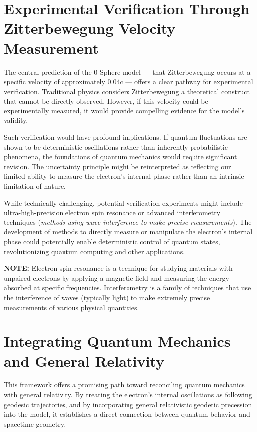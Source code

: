 \documentclass[12pt,letterpaper]{article} %
\begin{document}
\section{Experimental Verification Through Zitterbewegung Velocity Measurement}

The central prediction of the 0-Sphere model --- that Zitterbewegung occurs at a specific velocity of approximately 0.04c --- offers a clear pathway for experimental verification\cite{hanamura2025}. Traditional physics considers Zitterbewegung a theoretical construct that cannot be directly observed. However, if this velocity could be experimentally measured, it would provide compelling evidence for the model's validity.

Such verification would have profound implications. If quantum fluctuations are shown to be deterministic oscillations rather than inherently probabilistic phenomena, the foundations of quantum mechanics would require significant revision. The uncertainty principle might be reinterpreted as reflecting our limited ability to measure the electron's internal phase rather than an intrinsic limitation of nature.

While technically challenging, potential verification experiments might include ultra-high-precision electron spin resonance\cite{fan2023} or advanced interferometry techniques (\textit{methods using wave interference to make precise measurements}). The development of methods to directly measure or manipulate the electron's internal phase could potentially enable deterministic control of quantum states, revolutionizing quantum computing and other applications.

\vspace{0.5cm}
\noindent\textbf{NOTE:} Electron spin resonance is a technique for studying materials with unpaired electrons by applying a magnetic field and measuring the energy absorbed at specific frequencies. Interferometry is a family of techniques that use the interference of waves (typically light) to make extremely precise measurements of various physical quantities.


\section{Integrating Quantum Mechanics and General Relativity}

This framework offers a promising path toward reconciling quantum mechanics with general relativity\cite{hanamura2025}. By treating the electron's internal oscillations as following geodesic trajectories, and by incorporating general relativistic geodetic precession into the model, it establishes a direct connection between quantum behavior and spacetime geometry.
\end{document}
